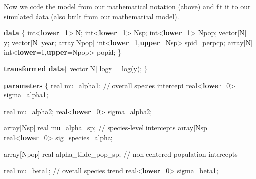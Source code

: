 \documentclass[
  letterpaper,
  DIV=11,
  numbers=noendperiod]{scrartcl}
\newenvironment{Shaded}{\begin{snugshade}}{\end{snugshade}}
\newcommand{\CommentTok}[1]{\textcolor[rgb]{0.37,0.37,0.37}{#1}}
\newcommand{\DataTypeTok}[1]{\textcolor[rgb]{0.68,0.00,0.00}{#1}}
\newcommand{\DecValTok}[1]{\textcolor[rgb]{0.68,0.00,0.00}{#1}}
\newcommand{\KeywordTok}[1]{\textcolor[rgb]{0.00,0.23,0.31}{\textbf{#1}}}
\newcommand{\NormalTok}[1]{\textcolor[rgb]{0.00,0.23,0.31}{#1}}
\begin{document}
Now we code the model from our mathematical notation (above) and fit it
to our simulated data (also built from our mathematical model).

\begin{Shaded}
\begin{Highlighting}[]

\KeywordTok{data}\NormalTok{ \{}
  \DataTypeTok{int}\NormalTok{\textless{}}\KeywordTok{lower}\NormalTok{=}\DecValTok{1}\NormalTok{\textgreater{} N;}
  \DataTypeTok{int}\NormalTok{\textless{}}\KeywordTok{lower}\NormalTok{=}\DecValTok{1}\NormalTok{\textgreater{} Nsp;}
  \DataTypeTok{int}\NormalTok{\textless{}}\KeywordTok{lower}\NormalTok{=}\DecValTok{1}\NormalTok{\textgreater{} Npop;}
  \DataTypeTok{vector}\NormalTok{[N] y;}
  \DataTypeTok{vector}\NormalTok{[N] year;}
  \DataTypeTok{array}\NormalTok{[Npop] }\DataTypeTok{int}\NormalTok{\textless{}}\KeywordTok{lower}\NormalTok{=}\DecValTok{1}\NormalTok{,}\KeywordTok{upper}\NormalTok{=Nsp\textgreater{} spid\_perpop;}
  \DataTypeTok{array}\NormalTok{[N] }\DataTypeTok{int}\NormalTok{\textless{}}\KeywordTok{lower}\NormalTok{=}\DecValTok{1}\NormalTok{,}\KeywordTok{upper}\NormalTok{=Npop\textgreater{} popid;}
\NormalTok{\}}

\KeywordTok{transformed data}\NormalTok{\{}
  \DataTypeTok{vector}\NormalTok{[N] logy = log(y);}
\NormalTok{\}}

\KeywordTok{parameters}\NormalTok{ \{}
  \DataTypeTok{real}\NormalTok{ mu\_alpha1; }\CommentTok{// overall species intercept}
  \DataTypeTok{real}\NormalTok{\textless{}}\KeywordTok{lower}\NormalTok{=}\DecValTok{0}\NormalTok{\textgreater{} sigma\_alpha1; }
  
  \DataTypeTok{real}\NormalTok{ mu\_alpha2;}
  \DataTypeTok{real}\NormalTok{\textless{}}\KeywordTok{lower}\NormalTok{=}\DecValTok{0}\NormalTok{\textgreater{} sigma\_alpha2;}
  
  \DataTypeTok{array}\NormalTok{[Nsp] }\DataTypeTok{real}\NormalTok{ mu\_alpha\_sp; }\CommentTok{// species{-}level intercepts}
  \DataTypeTok{array}\NormalTok{[Nsp] }\DataTypeTok{real}\NormalTok{\textless{}}\KeywordTok{lower}\NormalTok{=}\DecValTok{0}\NormalTok{\textgreater{} sig\_species\_alpha;}
  
  \DataTypeTok{array}\NormalTok{[Npop] }\DataTypeTok{real}\NormalTok{ alpha\_tilde\_pop\_sp; }\CommentTok{// non{-}centered population intercepts}
  
  \DataTypeTok{real}\NormalTok{ mu\_beta1; }\CommentTok{// overall species trend}
  \DataTypeTok{real}\NormalTok{\textless{}}\KeywordTok{lower}\NormalTok{=}\DecValTok{0}\NormalTok{\textgreater{} sigma\_beta1;}
  

\end{Highlighting}
\end{Shaded}
\end{document}
